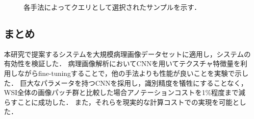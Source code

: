 \begin{figure}[hbp]
  \begin{center}

  \caption{\label{figure:camelyon_query_examples}各手法によってクエリとして選択されたサンプルを示す．}
  \end{center}
\end{figure}


\subsection{まとめ}
本研究で提案するシステムを大規模病理画像データセットに適用し，システムの有効性を検証した．
病理画像解析においてCNNを用いてテクスチャ特徴量を利用しながらfine-tuningすることで，他の手法よりも性能が良いことを実験で示した．
巨大なパラメータを持つCNNを採用し，識別精度を犠牲にすることなく，WSI全体の画像パッチ群と比較した場合アノテーションコストを1$\%$程度まで減らすことに成功した．
また，それらを現実的な計算コストでの実現を可能とした．
